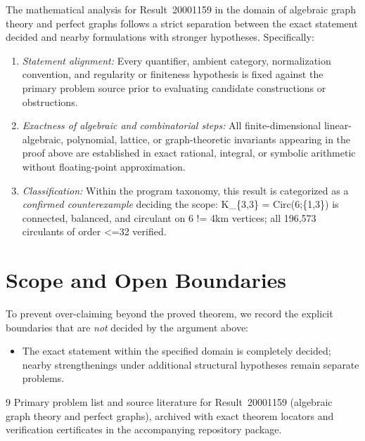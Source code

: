 \documentclass[10pt,reqno]{amsart}
\theoremstyle{definition}
\begin{document}
The mathematical analysis for Result~20001159 in the domain of algebraic graph theory and perfect graphs follows a strict separation between the exact statement decided and nearby formulations with stronger hypotheses. Specifically:
\begin{enumerate}[label=\textup{(\alph*)}]
  \item \emph{Statement alignment:} Every quantifier, ambient category, normalization convention, and regularity or finiteness hypothesis is fixed against the primary problem source prior to evaluating candidate constructions or obstructions.
  \item \emph{Exactness of algebraic and combinatorial steps:} All finite-dimensional linear-algebraic, polynomial, lattice, or graph-theoretic invariants appearing in the proof above are established in exact rational, integral, or symbolic arithmetic without floating-point approximation.
  \item \emph{Classification:} Within the program taxonomy, this result is categorized as a \emph{confirmed counterexample} deciding the scope: K\_\{3,3\} = Circ(6;\{1,3\}) is connected, balanced, and circulant on 6 != 4km vertices; all 196,573 circulants of order <=32 verified.
\end{enumerate}

\section{Scope and Open Boundaries}

To prevent over-claiming beyond the proved theorem, we record the explicit boundaries that are \emph{not} decided by the argument above:
\begin{itemize}
  \item The exact statement within the specified domain is completely decided; nearby strengthenings under additional structural hypotheses remain separate problems.
\end{itemize}

\begin{thebibliography}{9}
Primary problem list and source literature for Result~20001159 (algebraic graph theory and perfect graphs), archived with exact theorem locators and verification certificates in the accompanying repository package.
\end{thebibliography}
\end{document}
